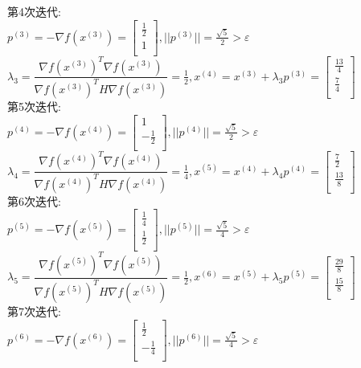 \begin{solution}
    第4次迭代:\\
    $p^{(3)}=-\nabla f(x^{(3)})=\begin{bmatrix} \frac{1}{2}\\1\\\end{bmatrix},||p^{(3)}||=\frac{\sqrt{5}}{2}>\varepsilon$\\
    $\lambda_3=\dfrac{\nabla f(x^{(3)})^T\nabla f(x^{(3)})}{\nabla f(x^{(3)})^TH\nabla f(x^{(3)})}=\frac{1}{2},x^{(4)}=x^{(3)}+\lambda_3p^{(3)}=\begin{bmatrix} \frac{13}{4}\\\frac{7}{4}\\\end{bmatrix}$\\
    第5次迭代:\\
    $p^{(4)}=-\nabla f(x^{(4)})=\begin{bmatrix} 1\\-\frac{1}{2}\\\end{bmatrix},||p^{(4)}||=\frac{\sqrt{5}}{2}>\varepsilon$\\
    $\lambda_4=\dfrac{\nabla f(x^{(4)})^T\nabla f(x^{(4)})}{\nabla f(x^{(4)})^TH\nabla f(x^{(4)})}=\frac{1}{4},x^{(5)}=x^{(4)}+\lambda_4p^{(4)}=\begin{bmatrix} \frac{7}{2}\\\frac{13}{8}\\\end{bmatrix}$\\
    第6次迭代:\\
    $p^{(5)}=-\nabla f(x^{(5)})=\begin{bmatrix} \frac{1}{4}\\\frac{1}{2}\\\end{bmatrix},||p^{(5)}||=\frac{\sqrt{5}}{4}>\varepsilon$\\
    $\lambda_5=\dfrac{\nabla f(x^{(5)})^T\nabla f(x^{(5)})}{\nabla f(x^{(5)})^TH\nabla f(x^{(5)})}=\frac{1}{2},x^{(6)}=x^{(5)}+\lambda_5p^{(5)}=\begin{bmatrix} \frac{29}{8}\\\frac{15}{8}\\\end{bmatrix}$\\
    第7次迭代:\\
    $p^{(6)}=-\nabla f(x^{(6)})=\begin{bmatrix} \frac{1}{2}\\-\frac{1}{4}\\\end{bmatrix},||p^{(6)}||=\frac{\sqrt{5}}{4}>\varepsilon$\\

\end{solution}
